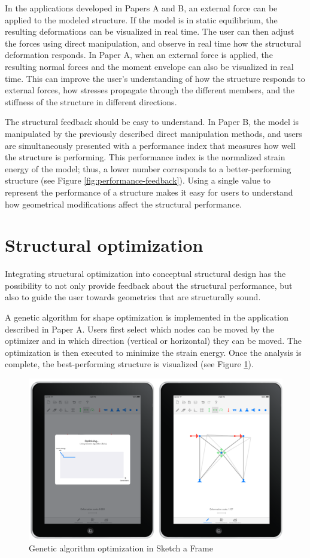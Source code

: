 In the applications developed in Papers A and B, an external force can be applied to the modeled structure. If the model is in static equilibrium, the resulting deformations can be visualized in real time. The user can then adjust the forces using direct manipulation, and observe in real time how the structural deformation responds. In Paper A, when an external force is applied, the resulting normal forces and the moment envelope can also be visualized in real time. This can improve the user’s understanding of how the structure responds to external forces, how stresses propagate through the different members, and the stiffness of the structure in different directions.

The structural feedback should be easy to understand. In Paper B, the model is manipulated by the previously described direct manipulation methods, and users are simultaneously presented with a performance index that measures how well the structure is performing. This performance index is the normalized strain energy of the model; thus, a lower number corresponds to a better-performing structure (see Figure \ref{fig:performance-feedback}). Using a single value to represent the performance of a structure makes it easy for users to understand how geometrical modifications affect the structural performance.


\section{Structural optimization}
Integrating structural optimization into conceptual structural design has the possibility to not only provide feedback about the structural performance, but also to guide the user towards geometries that are structurally sound. 

A genetic algorithm for shape optimization is implemented in the application described in Paper A. Users first select which nodes can be moved by the optimizer and in which direction (vertical or horizontal) they can be moved. The optimization is then executed to minimize the strain energy. Once the analysis is complete, the best-performing structure is visualized (see Figure \ref{fig:ipad-ga}). 

\begin{figure}
  \includegraphics[width=330pt]{graphics/ipad-ga.png}
  \caption{Genetic algorithm optimization in Sketch a Frame}
  \label{fig:ipad-ga}
\end{figure}

